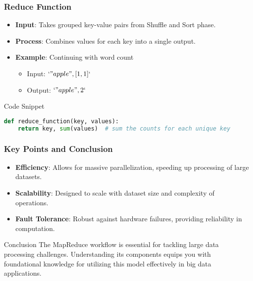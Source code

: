 \documentclass[aspectratio=169]{beamer}
\begin{document}
\begin{frame}[fragile]
    \frametitle{Reduce Function}
    \begin{itemize}
        \item \textbf{Input}: Takes grouped key-value pairs from Shuffle and Sort phase.
        \item \textbf{Process}: Combines values for each key into a single output.
        
        \item \textbf{Example}: Continuing with word count
        \begin{itemize}
            \item Input: \(`"apple", [1, 1]`\)
            \item Output: \(`"apple", 2`\)
        \end{itemize}
    \end{itemize}
    
    \begin{block}{Code Snippet}
        \begin{lstlisting}[language=Python]
def reduce_function(key, values):
    return key, sum(values)  # sum the counts for each unique key
        \end{lstlisting}
    \end{block}
\end{frame}

\begin{frame}
    \frametitle{Key Points and Conclusion}
    \begin{itemize}
        \item \textbf{Efficiency}: Allows for massive parallelization, speeding up processing of large datasets.
        \item \textbf{Scalability}: Designed to scale with dataset size and complexity of operations.
        \item \textbf{Fault Tolerance}: Robust against hardware failures, providing reliability in computation.
    \end{itemize}
    
    \begin{block}{Conclusion}
        The MapReduce workflow is essential for tackling large data processing challenges. Understanding its components equips you with foundational knowledge for utilizing this model effectively in big data applications.
    \end{block}
\end{frame}
\end{document}
